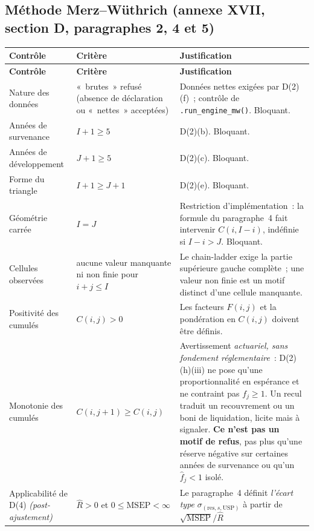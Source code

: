 \documentclass[a4paper,11pt]{article}
\newcommand{\code}[1]{\texttt{\small #1}}
\begin{document}
\subsection*{Méthode Merz--Wüthrich (annexe XVII, section D, paragraphes 2, 4 et 5)}

{\small
{}
\begin{longtable}{@{}p{4.4cm}p{5.0cm}p{5.4cm}@{}}
\rowcolor{tableheader}
\textcolor{financeblue}{\textbf{Contrôle}} &
\textcolor{financeblue}{\textbf{Critère}} &
\textcolor{financeblue}{\textbf{Justification}} \\
\endfirsthead
\rowcolor{tableheader}
\textcolor{financeblue}{\textbf{Contrôle}} &
\textcolor{financeblue}{\textbf{Critère}} &
\textcolor{financeblue}{\textbf{Justification}} \\
\endhead
Nature des données & «~brutes~» refusé (absence de déclaration ou «~nettes~» acceptées) &
Données nettes exigées par D(2)(f)~; contrôle de \code{.run\_engine\_mw()}. Bloquant. \\
Années de survenance & $I + 1 \ge 5$ & D(2)(b). Bloquant. \\
Années de développement & $J + 1 \ge 5$ & D(2)(c). Bloquant. \\
Forme du triangle & $I + 1 \ge J + 1$ & D(2)(e). Bloquant. \\
Géométrie carrée & $I = J$ & Restriction d'implémentation~: la formule du
paragraphe~4 fait intervenir $C(i,I-i)$, indéfinie si $I - i > J$. Bloquant. \\
Cellules observées & aucune valeur manquante ni non finie pour $i + j \le I$ & Le
chain-ladder exige la partie supérieure gauche complète~; une valeur non finie est un
motif distinct d'une cellule manquante. \\
Positivité des cumulés & $C(i,j) > 0$ & Les facteurs $F(i,j)$ et la pondération
en $C(i,j)$ doivent être définis. \\
Monotonie des cumulés & $C(i,j+1) \ge C(i,j)$ & Avertissement \emph{actuariel,
sans fondement réglementaire}~: D(2)(h)(iii) ne pose qu'une
proportionnalité en espérance et ne contraint pas $f_j \ge 1$. Un recul traduit
un recouvrement ou un boni de liquidation, licite mais à signaler. \textbf{Ce
n'est pas un motif de refus}, pas plus qu'une réserve négative sur certaines
années de survenance ou qu'un $\hat f_j < 1$ isolé. \\
Applicabilité de D(4) \emph{(post-ajustement)} & $\hat R > 0$ et
$0 \le \mathrm{MSEP} < \infty$ & Le paragraphe~4 définit \emph{l'écart type}
$\sigma_{(\text{res},s,\mathrm{USP})}$ à partir de $\sqrt{\mathrm{MSEP}}/\hat R$

\end{longtable}}
\end{document}

